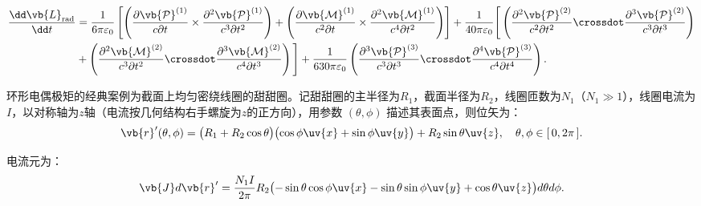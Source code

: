\begin{align*}
	\frac{\dd  \vb{L}_{\text{rad}}}{\dd t} &= \frac{1}{6\pi \varepsilon_0} \left[ \left( \frac{\partial \vb{\mathcal{P}}^{(1)}}{c \partial t} \times \frac{\partial^2 \vb{\mathcal{P}}^{(1)}}{c^3 \partial t^2} \right) + \left( \frac{\partial \vb{\mathcal{M}}^{(1)}}{c^2 \partial t} \times \frac{\partial^2 \vb{\mathcal{M}}^{(1)}}{c^4 \partial t^2} \right) \right] + \frac{1}{40\pi \varepsilon_0} \Bigg[ \left( \frac{\partial^2 \vb{\mathcal{P}}^{(2)}}{c^2 \partial t^2} \crossdot \frac{\partial^3 \vb{\mathcal{P}}^{(2)}}{c^3 \partial t^3} \right) \\\qquad\qquad&+ \left( \frac{\partial^2 \vb{\mathcal{M}}^{(2)}}{c^3 \partial t^2} \crossdot\frac{\partial^3 \vb{\mathcal{M}}^{(2)}}{c^4 \partial t^3} \right) \Bigg] + \frac{1}{630\pi \varepsilon_0} \left( \frac{\partial^3 \vb{\mathcal{P}}^{(3)}}{c^3 \partial t^3} \crossdot \frac{\partial^4 \vb{\mathcal{P}}^{(3)}}{c^4 \partial t^4} \right).
\end{align*}

环形电偶极矩的经典案例为截面上均匀密绕线圈的甜甜圈。记甜甜圈的主半径为\(R_1\)，截面半径为\(R_2\)，线圈匝数为\(N_1\)（\(N_1 \gg 1\)），线圈电流为\(I\)，以对称轴为\(z\)轴（电流按几何结构右手螺旋为\(z\)的正方向），用参数 \((\theta, \phi)\) 描述其表面点，则位矢为：
\begin{align*}
	\vb{r}'(\theta, \phi) = \bigl(R_1 + R_2\cos\theta\bigr)\bigl(\cos\phi\uv{x} + \sin\phi\uv{y}\bigr) + R_2\sin\theta\uv{z}, \quad \theta, \phi \in [\,0, 2\pi\,].
\end{align*}

电流元为：
\begin{align*}
	\vb{J} d\vb{r}' = \frac{N_1I}{2\pi}R_2 \bigl(-\sin\theta\cos\phi\uv{x} - \sin\theta\sin\phi\uv{y} + \cos\theta\uv{z}\bigr) d\theta d\phi.
\end{align*}

